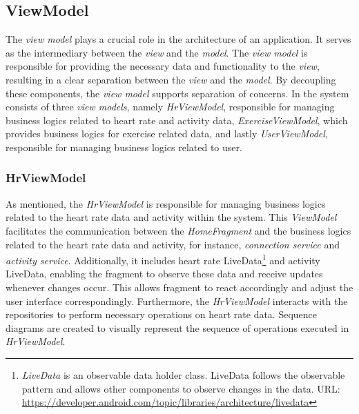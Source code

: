 \subsection{ViewModel}
\label{chap:viewmodel_design}
The \emph{view model} plays a crucial role in the architecture of an application. It serves as the intermediary between the \emph{view} and the \emph{model}.
The \emph{view model} is responsible for providing the necessary data and functionality to the \emph{view}, resulting in a clear separation between the \emph{view} and the \emph{model}.
By decoupling these components, the \emph{view model} supports separation of concerns.
In the system consists of three \emph{view models}, namely \emph{HrViewModel}, responsible for managing business logics related to heart rate and activity data, \emph{ExerciseViewModel}, which provides business logics for exercise related data, and lastly \emph{UserViewModel}, responsible for managing business logics related to user.

\subsubsection{HrViewModel}
As mentioned, the \emph{HrViewModel} is responsible for managing business logics related to the heart rate data and activity within the system.
This \emph{ViewModel} facilitates the communication between the \emph{HomeFragment} and the business logics related to the heart rate data and activity, for instance, \emph{connection service} and \emph{activity service}.
Additionally, it includes heart rate LiveData\footnote{\emph{LiveData} is an observable data holder class. LiveData follows the observable pattern and allows other components to observe changes in the data. URL: \url{https://developer.android.com/topic/libraries/architecture/livedata}} and activity LiveData, enabling the fragment to observe these data and receive updates whenever changes occur. This allows fragment to react accordingly and adjust the user interface correspondingly.
Furthermore, the \emph{HrViewModel} interacts with the repositories to perform necessary operations on heart rate data.
Sequence diagrams are created to visually represent the sequence of operations executed in \emph{HrViewModel}.


